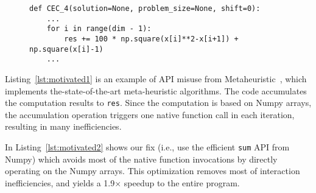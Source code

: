 \begin{comment}

\begin{figure}[t]
\begin{lstlisting}[caption={Scikit-learn opt (inappropriate algorithm)},label=lst:scikit2]
def lars_path(X, y, Xy=None, ...):
    ...
    tmp1 = X.T[ii].copy()
    tmp2 = indices[ii].copy()
    X.T[ii:n_active,:] = X.T[ii+1:n_active+1, :]
    X.T[n_active] = tmp1
    indices[ii:n_active] = indices[ii+1:n_active+1]
    indices[n_active] = tmp2
    ...
\end{lstlisting}
\end{figure}

\end{comment}

\begin{figure}[t]
\begin{lstlisting}[caption={
Interaction inefficiencies in Metaheuristic~\cite{nguyen2019building, nguyen2018resource} due to the API misuse in native Libraries.},label=lst:motivated1]
def CEC_4(solution=None, problem_size=None, shift=0):
    ...
    for i in range(dim - 1):
        res += 100 * np.square(x[i]**2-x[i+1]) + np.square(x[i]-1)
    ...
\end{lstlisting}
\end{figure}




Listing~\ref{lst:motivated1} is an example of API misuse from Metaheuristic~\cite{nguyen2019building, nguyen2018resource}, which implements the-state-of-the-art meta-heuristic algorithms. The code accumulates the computation results to {\tt res}. Since the computation is based on Numpy arrays, the accumulation operation triggers one native function call in each iteration, resulting in many inefficiencies. 


In Listing~\ref{lst:motivated2} shows our fix (i.e., use the efficient {\tt sum} API from Numpy) which avoids most of the native function invocations by directly operating on the Numpy arrays. This optimization removes most of interaction inefficiencies, and yields a 1.9$\times$ speedup to the entire program. 



